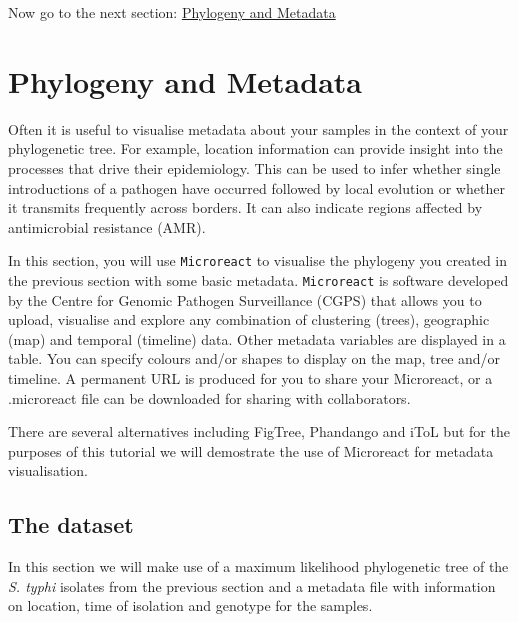 \documentclass[11pt]{article}
\begin{document}
    Now go to the next section: \href{metadata.ipynb}{Phylogeny and
Metadata}





\newpage





    \hypertarget{phylogeny-and-metadata}{%
\section{Phylogeny and Metadata}\label{phylogeny-and-metadata}}

Often it is useful to visualise metadata about your samples in the
context of your phylogenetic tree. For example, location information can
provide insight into the processes that drive their epidemiology. This
can be used to infer whether single introductions of a pathogen have
occurred followed by local evolution or whether it transmits frequently
across borders. It can also indicate regions affected by antimicrobial
resistance (AMR).

In this section, you will use \texttt{Microreact} to visualise the
phylogeny you created in the previous section with some basic metadata.
\texttt{Microreact} is software developed by the Centre for Genomic
Pathogen Surveillance (CGPS) that allows you to upload, visualise and
explore any combination of clustering (trees), geographic (map) and
temporal (timeline) data. Other metadata variables are displayed in a
table. You can specify colours and/or shapes to display on the map, tree
and/or timeline. A permanent URL is produced for you to share your
Microreact, or a .microreact file can be downloaded for sharing with
collaborators.

There are several alternatives including FigTree, Phandango and iToL but
for the purposes of this tutorial we will demostrate the use of
Microreact for metadata visualisation.

    \hypertarget{the-dataset}{%
\subsection{The dataset}\label{the-dataset}}

In this section we will make use of a maximum likelihood phylogenetic
tree of the \textit{S. typhi} isolates from the previous section and a
metadata file with information on location, time of isolation and
genotype for the samples.
\end{document}
